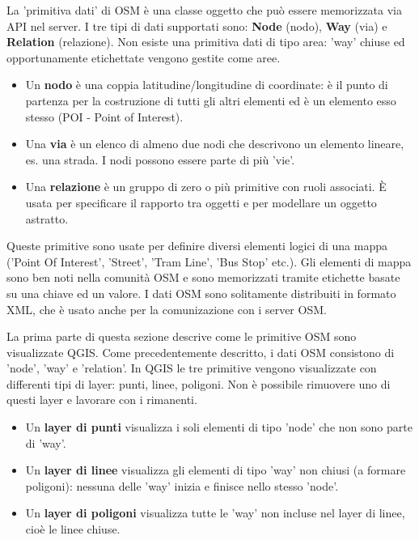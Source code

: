 La 'primitiva dati' di OSM è una classe oggetto che può essere memorizzata via API nel server.
I tre tipi di dati supportati sono: \textbf{Node} (nodo), \textbf{Way} (via)
e \textbf{Relation} (relazione). Non esiste una primitiva dati di tipo area: 'way' chiuse ed 
opportunamente etichettate vengono gestite come aree.

\begin{itemize}[label=--]
\item Un \textbf{nodo} è una coppia latitudine/longitudine di coordinate: è il punto di partenza 
per la costruzione di tutti gli altri elementi ed è un elemento esso stesso 
(POI - Point of Interest).
\item Una \textbf{via} è un elenco di almeno due nodi che descrivono un elemento 
lineare, es. una strada. I nodi possono essere parte di più 'vie'.
\item Una \textbf{relazione} è un gruppo di zero o più primitive 
con ruoli associati. È usata per specificare il rapporto tra oggetti e per modellare un 
oggetto astratto.
\end{itemize}

Queste primitive sono usate per definire diversi elementi logici di una mappa 
('Point Of Interest', 'Street', 'Tram Line', 'Bus Stop' etc.).
Gli elementi di mappa sono ben noti nella comunità OSM e sono memorizzati 
tramite etichette basate su una chiave ed un valore. 
I dati OSM sono solitamente distribuiti in formato XML, che è usato anche per 
la comunizazione con i server OSM.

\label{qgis-osm-connection}

La prima parte di questa sezione descrive come le primitive OSM sono visualizzate QGIS.
Come precedentemente descritto, i dati OSM consistono di 'node', 'way' e 'relation'. In 
QGIS le tre primitive vengono visualizzate con differenti tipi di layer: punti, linee, 
poligoni. Non è possibile rimuovere uno di questi layer e lavorare con i rimanenti.

\begin{itemize}[label=--]
\item Un \textbf{layer di punti} visualizza i soli elementi di tipo 'node' che non sono 
parte di 'way'. 
\item Un \textbf{layer di linee} visualizza gli elementi di tipo 'way' non chiusi (a formare 
poligoni): nessuna delle 'way' inizia e finisce nello stesso 'node'.
\item Un \textbf{layer di poligoni} visualizza tutte le 'way' non incluse nel layer di linee, 
cioè le linee chiuse.
\end{itemize}

